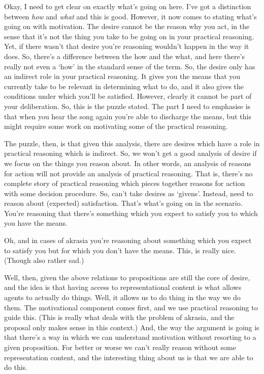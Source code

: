 \documentclass[10pt]{article}
\begin{document}
{\color{red}
  Okay, I need to get clear on exactly what's going on here.
  I've got a distinction between \emph{how} and \emph{what} and this is good.
  However, it now comes to stating what's going on with motivation.
  The desire cannot be the reason why you act, in the sense that it's not the thing you take to be going on in your practical reasoning.
  Yet, if there wasn't that desire you're reasoning wouldn't happen in the way it does.
  So, there's a difference between the how and the what, and here there's really not even a `how' in the standard sense of the term.
  So, the desire only has an indirect role in your practical reasoning.
  It gives you the means that you currently take to be relevant in determining what to do, and it also gives the conditions under which you'll be satisfied.
  However, clearly it cannot be part of your deliberation.
  So, this is the puzzle stated.
  The part I need to emphasise is that when you hear the song again you're able to discharge the means, but this might require some work on motivating some of the practical reasoning.
}

{\color{blue}
  The puzzle, then, is that given this analysis, there are desires which have a role in practical reasoning which is indirect.
  So, we won't get a good analysis of desire if we focus on the things you reason about.
  In other words, an analysis of reasons for action will not provide an analysis of practical reasoning.
  That is, there's no complete story of practical reasoning which pieces together reasons for action with some decision procedure.
  So, can't take desires as `givens'.
  Instead, need to reason about (expected) satisfaction.
  That's what's going on in the scenario.
  You're reasoning that there's something which you expect to satisfy you to which you have the means.
}

{\color{green}
  Oh, and in cases of akrasia you're reasoning about something which you expect to satisfy you but for which you don't have the means.
  This, is really nice.
  (Though also rather sad.)
}

{\color{blue}
  Well, then, given the above relations to propositions are still the core of desire, and the idea is that having access to representational content is what allows agents to actually do things.
  Well, it allows us to do thing in the way we do them.
  The motivational component comes first, and we use practical reasoning to guide this.
  (This is really what deals with the problem of akrasia, and the proposal only makes sense in this context.)
  And, the way the argument is going is that there's a way in which we can understand motivation without resorting to a given proposition.
  For better or worse we can't really reason without some representation content, and the interesting thing about us is that we are able to do this.
  
}
\end{document}
